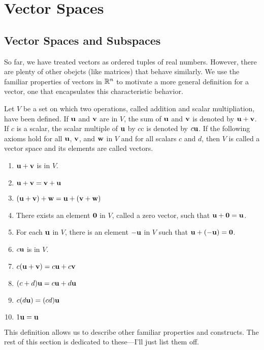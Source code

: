 \documentclass[../m73main.tex]{subfiles}
\begin{document}
\chapter{Vector Spaces}

\section{Vector Spaces and Subspaces}
So far, we have treated vectors as ordered tuples of real numbers.
However, there are plenty of other obejcts (like matrices) that behave similarly.
We use the familiar properties of vectors in $\mathbb{R}^n$ to motivate a more general definition for a vector, one that encapsulates this characteristic behavior.

\begin{definition}
	Let $V$ be a set on which two operations, called addition and scalar multipliation, have been defined.
	If $\mathbf{u}$ and $\mathbf{v}$ are in $V$, the sum of $\mathbf{u}$ and $\mathbf{v}$ is denoted by $\mathbf{u} + \mathbf{v}$.
	If $c$ is a scalar, the scalar multiple of $\mathbf{u}$ by $c$c is denoted by $c \mathbf{u}$.
	If the following axioms hold for all $\mathbf{u}$, $\mathbf{v}$, and $\mathbf{w}$ in $V$ and for all scalars $c$ and $d$, then $V$ is called a vector space and its elements are called vectors.
	\begin{enumerate}
		\item $\mathbf{u} + \mathbf{v}$ is in $V$.
		\item $\mathbf{u} + \mathbf{v} = \mathbf{v} + \mathbf{u}$
		\item $(\mathbf{u} + \mathbf{v}) + \mathbf{w} = \mathbf{u} + (\mathbf{v} + \mathbf{w})$
		\item There exists an element $\mathbf{0}$ in $V$, called a zero vector, such that $\mathbf{u} + \mathbf{0} = \mathbf{u}$.
		\item For each $\mathbf{u}$ in $V$, there is an element $-\mathbf{u}$ in $V$ such that $\mathbf{u} + (-\mathbf{u}) = \mathbf{0}$.
		\item $c \mathbf{u}$ is in $V$.
		\item $c(\mathbf{u} + \mathbf{v}) = c \mathbf{u} + c \mathbf{v}$
		\item $(c + d) \mathbf{u} = c \mathbf{u} + d \mathbf{u}$
		\item $c(d \mathbf{u}) = (cd) \mathbf{u}$
		\item $1 \mathbf{u} = \mathbf{u}$
	\end{enumerate}
\end{definition}

This definition allows us to describe other familiar properties and constructs.
The rest of this section is dedicated to these---I'll just list them off.
\end{document}
